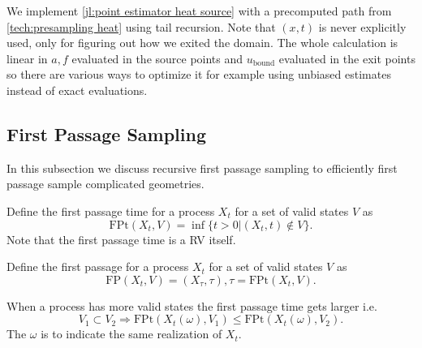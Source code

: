 \documentclass[a4paper,12pt]{article}
\begin{document}
\begin{julia}\label{jl:path point estimator heat source}
  We implement \ref{jl:point estimator heat source} with a precomputed path from \ref{tech:presampling heat} using tail
  recursion. Note that $(x,t)$ is
  never explicitly used, only for figuring out how we exited the domain. The whole calculation is linear in
  $a,f$ evaluated in the source points and $u_\text{bound}$ evaluated in the exit points so there are various
  ways to optimize it for example using unbiased estimates instead of exact evaluations.

\end{julia}




\subsection{First Passage Sampling}

In this subsection we discuss recursive first passage sampling to efficiently
first passage sample complicated geometries.


\begin{definition} \label{def:first passage time}
  Define the first passage time for a process $X_{t}$ for a set of valid states
  $V$ as
  \begin{equation}
    \text{FPt}(X_{t},V)=\inf \{t>0| (X_{t},t) \notin V \}
    .
  \end{equation}
  Note that the first passage time is a RV itself.
\end{definition}

\begin{definition} \label{def:first passage}
  Define the first passage for a process $X_{t}$ for a set of valid states
  $V$ as
  \begin{equation}
    \text{FP}(X_{t},V)=(X_{\tau},\tau), \tau = \text{FPt}(X_{t},V)
    .
  \end{equation}
\end{definition}

\begin{lemma} \label{lem: FP order}
  When a process has more valid states the first passage time gets larger i.e.
  \begin{equation}
    V_{1} \subset V_{2} \Rightarrow
    \text{FPt}(X_{t}(\omega),V_{1}) \le  \text{FPt}(X_{t}(\omega),V_{2}) .
  \end{equation}
  The $\omega$ is to indicate the same realization of $X_{t}$.
\end{lemma}
\end{document}
